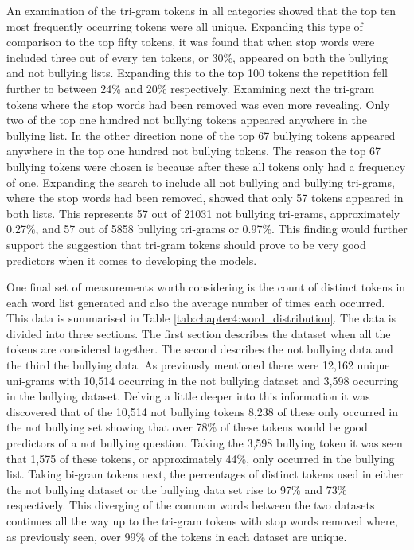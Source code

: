 An examination of the tri-gram tokens in all categories showed that the top ten most frequently occurring tokens were all unique. Expanding this type of comparison to the top fifty tokens, it was found that when stop words were included three out of every ten tokens, or 30\%, appeared on both the bullying and not bullying lists. Expanding this to the top 100 tokens the repetition fell further to between 24\% and 20\% respectively. Examining next the tri-gram tokens where the stop words had been removed was even more revealing. Only two of the top one hundred not bullying tokens appeared anywhere in the bullying list. In the other direction none of the top 67 bullying tokens appeared anywhere in the top one hundred not bullying tokens. The reason the top 67 bullying tokens were chosen is because after these all tokens only had a frequency of one. Expanding the search to include all not bullying and bullying tri-grams, where the stop words had been removed, showed that only 57 tokens appeared in both lists. This represents 57 out of 21031 not bullying tri-grams, approximately 0.27\%, and 57 out of 5858 bullying tri-grams or 0.97\%. This finding would further support the suggestion that tri-gram tokens should prove to be very good predictors when it comes to developing the models.

One final set of measurements worth considering is the count of distinct tokens in each word list generated and also the average number of times each occurred. This data is summarised in Table \ref{tab:chapter4:word_distribution}. The data is divided into three sections. The first section describes the dataset when all the tokens are considered together. The second describes the not bullying data and the third the bullying data. As previously mentioned there were 12,162 unique uni-grams with 10,514 occurring in the not bullying dataset and 3,598 occurring in the bullying dataset. Delving a little deeper into this information it was discovered that of the 10,514 not bullying tokens 8,238 of these only occurred in the not bullying set showing that over 78\% of these tokens would be good predictors of a not bullying question. Taking the 3,598 bullying token it was seen that 1,575 of these tokens, or approximately 44\%, only occurred in the bullying list. Taking bi-gram tokens next, the percentages of distinct tokens used in either the not bullying dataset or the bullying data set rise to 97\% and 73\% respectively. This diverging of the common words between the two datasets continues all the way up to the tri-gram tokens with stop words removed where, as previously seen, over 99\% of the tokens in each dataset are unique. 

